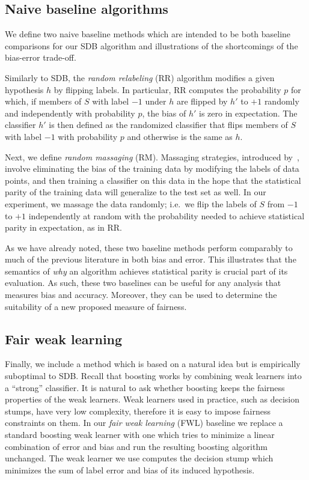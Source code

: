 \documentclass[twoside,leqno,twocolumn]{article}
\begin{document}
\subsection{Naive baseline algorithms}

We define two naive baseline methods which are intended to be both baseline
comparisons for our SDB algorithm and illustrations of the shortcomings of the
bias-error trade-off.

Similarly to SDB, the \emph{random relabeling} (RR) algorithm modifies a given
hypothesis $h$ by flipping labels. In particular, RR computes the probability
$p$ for which, if members of $S$ with label $-1$ under $h$ are flipped by $h'$
to $+1$ randomly and independently with probability $p$, the bias of $h'$ is
zero in expectation. The classifier $h'$ is then defined as the randomized
classifier that flips members of $S$ with label $-1$ with probability $p$ and
otherwise is the same as $h$.

Next, we define \emph{random massaging} (RM).  Massaging strategies, introduced
by~\cite{KamiranC09}, involve eliminating the bias of the training data by
modifying the labels of data points, and then training a classifier on this
data in the hope that the statistical parity of the training data will
generalize to the test set as well.  In our experiment, we massage the data
randomly; i.e.~we flip the labels of $S$ from $-1$ to $+1$ independently at
random with the probability needed to achieve statistical parity in
expectation, as in RR.

As we have already noted, these two baseline methods perform comparably to much
of the previous literature in both bias and error. This illustrates that the
semantics of \emph{why} an algorithm achieves statistical parity is crucial
part of its evaluation. As such, these two baselines can be useful for any analysis that measures bias and accuracy. Moreover, they can
be used to determine the suitability of a new proposed measure of fairness.

\subsection{Fair weak learning}

Finally, we include a method which is based on a natural idea but is
empirically suboptimal to SDB. Recall that boosting works by combining weak
learners into a ``strong'' classifier.  It is natural to ask whether boosting
keeps the fairness properties of the weak learners. Weak learners used in
practice, such as decision stumps, have very low complexity, therefore it is
easy to impose fairness constraints on them. In our \emph{fair weak learning}
(FWL) baseline we replace a standard boosting weak learner with one which tries
to minimize a linear combination of error and bias and run the resulting
boosting algorithm unchanged. The weak learner we use computes the decision
stump which minimizes the sum of label error and bias of its induced
hypothesis. 
\end{document}
